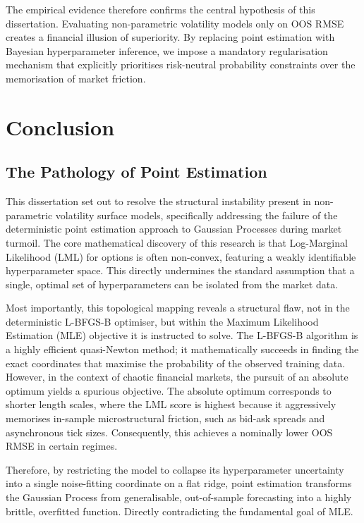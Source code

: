 \documentclass[12pt,oneside]{report}
\theoremstyle{definition}
\theoremstyle{remark}
\begin{document}
The empirical evidence therefore confirms the central hypothesis of this dissertation. Evaluating non-parametric volatility models only on OOS RMSE creates a financial illusion of superiority. By replacing point estimation with Bayesian hyperparameter inference, we impose a mandatory regularisation mechanism that explicitly prioritises risk-neutral probability constraints over the memorisation of market friction.

\chapter{Conclusion}
\section{The Pathology of Point Estimation}
This dissertation set out to resolve the structural instability present in non-parametric volatility surface models, specifically addressing the failure of the deterministic point estimation approach to Gaussian Processes during market turmoil. The core mathematical discovery of this research is that Log-Marginal Likelihood (LML) for options is often non-convex, featuring a weakly identifiable hyperparameter space. This directly undermines the standard assumption that a single, optimal set of hyperparameters can be isolated from the market data.

Most importantly, this topological mapping reveals a structural flaw, not in the deterministic L-BFGS-B optimiser, but within the Maximum Likelihood Estimation (MLE) objective it is instructed to solve. The L-BFGS-B algorithm is a highly efficient quasi-Newton method; it mathematically succeeds in finding the exact coordinates that maximise the probability of the observed training data. However, in the context of chaotic financial markets, the pursuit of an absolute optimum yields a spurious objective. The absolute optimum corresponds to shorter length scales, where the LML score is highest because it aggressively memorises in-sample microstructural friction, such as bid-ask spreads and asynchronous tick sizes. Consequently, this achieves a nominally lower OOS RMSE in certain regimes.

Therefore, by restricting the model to collapse its hyperparameter uncertainty into a single noise-fitting coordinate on a flat ridge, point estimation transforms the Gaussian Process from generalisable, out-of-sample forecasting into a highly brittle, overfitted function. Directly contradicting the fundamental goal of MLE.
\end{document}
